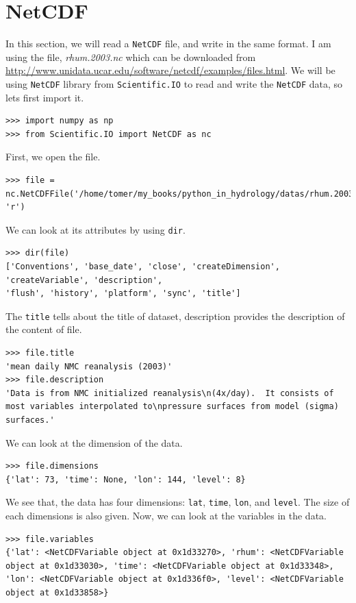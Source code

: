 \documentclass[10pt]{book}
\begin{document}
\section{NetCDF}
In this section, we will read a \verb"NetCDF" file, and write in the same format. I am using the file, \emph{rhum.2003.nc} which can be downloaded from \url{http://www.unidata.ucar.edu/software/netcdf/examples/files.html}. We will be using \verb"NetCDF" library from \verb"Scientific.IO" to read and write the \verb"NetCDF" data, so lets first import it.
\beforeverb \begin{verbatim}
>>> import numpy as np
>>> from Scientific.IO import NetCDF as nc
\end{verbatim} \afterverb

First, we open the file. 
\beforeverb \begin{verbatim}
>>> file = nc.NetCDFFile('/home/tomer/my_books/python_in_hydrology/datas/rhum.2003.nc', 'r')
\end{verbatim} \afterverb

We can look at its attributes by using \verb"dir".
\beforeverb \begin{verbatim}
>>> dir(file)
['Conventions', 'base_date', 'close', 'createDimension', 'createVariable', 'description', 
'flush', 'history', 'platform', 'sync', 'title']
\end{verbatim} \afterverb

The \verb"title" tells about the title of dataset, description provides the description of the content of file. 
\beforeverb \begin{verbatim}
>>> file.title
'mean daily NMC reanalysis (2003)'
>>> file.description
'Data is from NMC initialized reanalysis\n(4x/day).  It consists of most variables interpolated to\npressure surfaces from model (sigma) surfaces.'
\end{verbatim} \afterverb

We can look at the dimension of the data.
\beforeverb \begin{verbatim}
>>> file.dimensions
{'lat': 73, 'time': None, 'lon': 144, 'level': 8}
\end{verbatim} \afterverb
We see that, the data has four dimensions: \verb"lat", \verb"time", \verb"lon", and \verb"level". The size of each dimensions is also given. Now, we can look at the variables in the data.

\beforeverb \begin{verbatim}
>>> file.variables
{'lat': <NetCDFVariable object at 0x1d33270>, 'rhum': <NetCDFVariable object at 0x1d33030>, 'time': <NetCDFVariable object at 0x1d33348>, 'lon': <NetCDFVariable object at 0x1d336f0>, 'level': <NetCDFVariable object at 0x1d33858>}
\end{verbatim} \afterverb
\end{document}
